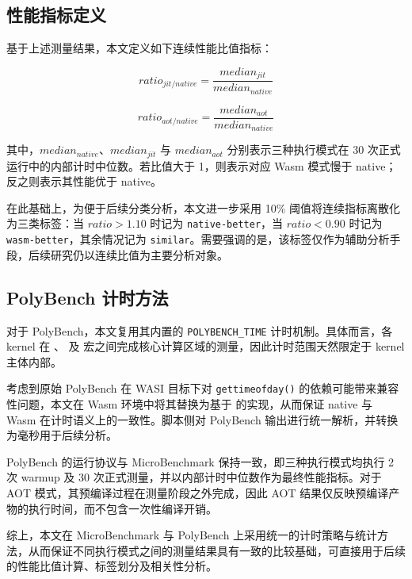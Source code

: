 \subsection{性能指标定义}

基于上述测量结果，本文定义如下连续性能比值指标：

\begin{equation}
ratio_{jit/native} = \frac{median_{jit}}{median_{native}}
\end{equation}

\begin{equation}
ratio_{aot/native} = \frac{median_{aot}}{median_{native}}
\end{equation}

其中，$median_{native}$、$median_{jit}$ 与 $median_{aot}$ 分别表示三种执行模式在 30 次正式运行中的内部计时中位数。若比值大于 1，则表示对应 Wasm 模式慢于 native；反之则表示其性能优于 native。

在此基础上，为便于后续分类分析，本文进一步采用 10\% 阈值将连续指标离散化为三类标签：当 $ratio > 1.10$ 时记为 \texttt{native-better}，当 $ratio < 0.90$ 时记为 \texttt{wasm-better}，其余情况记为 \texttt{similar}。需要强调的是，该标签仅作为辅助分析手段，后续研究仍以连续比值为主要分析对象。

\subsection{PolyBench 计时方法}

对于 PolyBench，本文复用其内置的 \texttt{POLYBENCH\_TIME} 计时机制。具体而言，各 kernel 在 、 及  宏之间完成核心计算区域的测量，因此计时范围天然限定于 kernel 主体内部。

考虑到原始 PolyBench 在 WASI 目标下对 \texttt{gettimeofday()} 的依赖可能带来兼容性问题，本文在 Wasm 环境中将其替换为基于  的实现，从而保证 native 与 Wasm 在计时语义上的一致性。脚本侧对 PolyBench 输出进行统一解析，并转换为毫秒用于后续分析。

PolyBench 的运行协议与 MicroBenchmark 保持一致，即三种执行模式均执行 2 次 warmup 及 30 次正式测量，并以内部计时中位数作为最终性能指标。对于 AOT 模式，其预编译过程在测量阶段之外完成，因此 AOT 结果仅反映预编译产物的执行时间，而不包含一次性编译开销。

综上，本文在 MicroBenchmark 与 PolyBench 上采用统一的计时策略与统计方法，从而保证不同执行模式之间的测量结果具有一致的比较基础，可直接用于后续的性能比值计算、标签划分及相关性分析。

